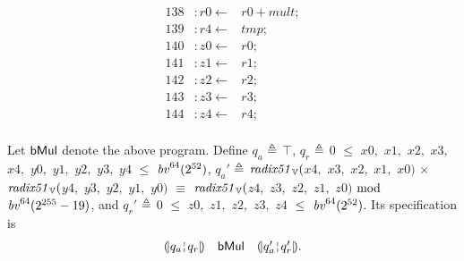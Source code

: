 {\begin{align*}
138 &: \mathit{r0} \leftarrow & \mathit{r0} + \mathit{mult}; \\
139 &: \mathit{r4} \leftarrow & \mathit{tmp}; \\
140 &: \mathit{z0} \leftarrow & \mathit{r0}; \\
141 &: \mathit{z1} \leftarrow & \mathit{r1}; \\
142 &: \mathit{z2} \leftarrow & \mathit{r2}; \\
143 &: \mathit{z3} \leftarrow & \mathit{r3}; \\
144 &: \mathit{z4} \leftarrow & \mathit{r4}; \\
\end{align*}
}

Let $\dslcode{bMul}$ denote the above program.
Define $q_a$ $\defn$ $\top$, $q_r$ $\defn$ $0$ $\leq$ $\mathit{x0},$ $\mathit{x1},$ $\mathit{x2},$ $\mathit{x3},$ $\mathit{x4},$ $\mathit{y0},$ $\mathit{y1},$ $\mathit{y2},$ $\mathit{y3},$ $\mathit{y4}$ $\leq$ $\bv^{64}(2^{52})$, $q_a'$ $\defn$ $\mathit{radix51}_\BV($$\mathit{x4},$ $\mathit{x3},$ $\mathit{x2},$ $\mathit{x1},$ $\mathit{x0})$ $\times$ $\mathit{radix51}_\BV($$\mathit{y4},$ $\mathit{y3},$ $\mathit{y2},$ $\mathit{y1},$ $\mathit{y0})$ $\equiv$ $\mathit{radix51}_\BV($$\mathit{z4},$ $\mathit{z3},$ $\mathit{z2},$ $\mathit{z1},$ $\mathit{z0})$ $\mod$ $\bv^{64}(2^{255} - 19)$, and $q_r'$ $\defn$ $0$ $\leq$ $\mathit{z0},$ $\mathit{z1},$ $\mathit{z2},$ $\mathit{z3},$ $\mathit{z4}$ $\leq$ $\bv^{64}(2^{52})$.
Its specification is
\[
\begin{array}{rcl}
\cond{q_a \andar q_r} &
\dslcode{bMul} &
\cond{q_a' \andar q_r'}.
\end{array}
\]
